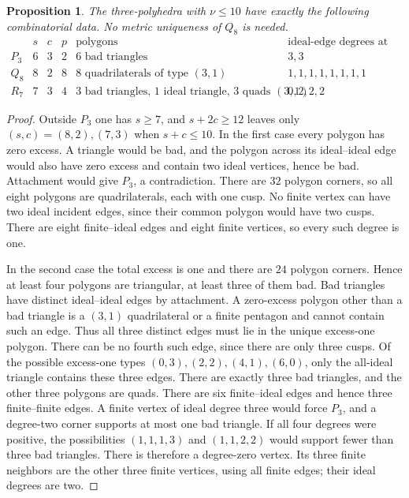 \documentclass[11pt]{article}
\newtheorem{proposition}[theorem]{Proposition}
\theoremstyle{definition}\newtheorem{definition}[theorem]{Definition}
\theoremstyle{remark}\newtheorem{remark}[theorem]{Remark}
\newcommand{\nuu}{\nu}
\newcommand{\Pthree}{P_3}
\newcommand{\Qeight}{Q_8}
\newcommand{\Rseven}{R_7}
\begin{document}
\begin{proposition}\label{prop:small}
The three-polyhedra with \(\nuu\le10\) have exactly the following
combinatorial data. No metric uniqueness of \(\Qeight\) is needed.
\[
\begin{array}{c|ccc|l|l}
 &s&c&p&\text{polygons}&\text{ideal-edge degrees at finite vertices}\\ \hline
 \Pthree&6&3&2&6\text{ bad triangles}&3,3\\
 \Qeight&8&2&8&8\text{ quadrilaterals of type }(3,1)&1,1,1,1,1,1,1,1\\
 \Rseven&7&3&4&3\text{ bad triangles},\,1\text{ ideal triangle},
 \,3\text{ quads }(3,1)&0,2,2,2
\end{array}
\]
\end{proposition}
\begin{proof}
Outside \(\Pthree\) one has \(s\ge7\), and \(s+2c\ge12\)
leaves only \((s,c)=(8,2),(7,3)\) when \(s+c\le10\).
In the first case every polygon has zero excess. A triangle would be
bad, and the polygon across its ideal--ideal edge would also have zero
excess and contain two ideal vertices, hence be bad. Attachment would
give \(\Pthree\), a contradiction. There are \(32\) polygon corners,
so all eight polygons are quadrilaterals, each with one cusp. No finite
vertex can have two ideal incident edges, since their common polygon
would have two cusps. There are eight finite--ideal edges and eight
finite vertices, so every such degree is one.

In the second case the total excess is one and there are \(24\)
polygon corners. Hence at least four polygons are triangular, at least
three of them bad. Bad triangles have distinct ideal--ideal edges by
attachment. A zero-excess polygon other than a bad triangle is a
\((3,1)\) quadrilateral or a finite pentagon and cannot contain such an
edge. Thus all three distinct edges must lie in the unique excess-one
polygon. There can be no fourth such edge, since there are only three
cusps. Of the possible excess-one types
\((0,3),(2,2),(4,1),(6,0)\), only the all-ideal triangle contains
these three edges. There are exactly three bad triangles, and the
other three polygons are quads.
There are six finite--ideal edges and hence three finite--finite
edges. A finite vertex of ideal degree three would force
\(\Pthree\), and a degree-two corner supports at most one bad triangle.
If all four degrees were positive, the possibilities
\((1,1,1,3)\) and \((1,1,2,2)\) would support fewer than three bad
triangles. There is therefore a degree-zero vertex. Its three finite
neighbors are the other three finite vertices, using all finite edges;
their ideal degrees are two.
\end{proof}
\end{document}
